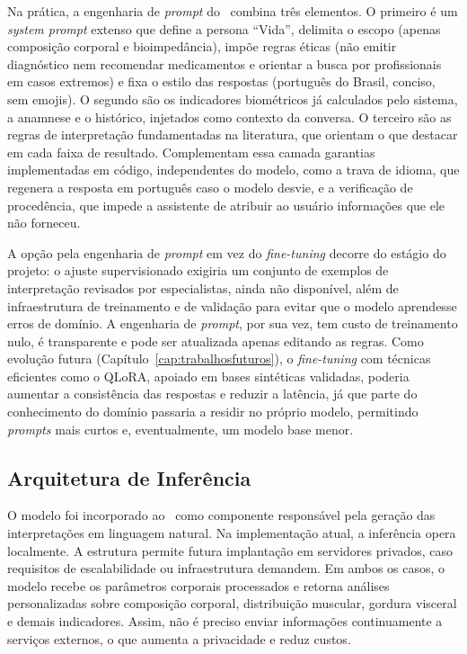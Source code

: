 Na prática, a engenharia de \emph{prompt} do \sintonia\ combina três elementos. O primeiro é
um \emph{system prompt} extenso que define a persona ``Vida'', delimita o escopo (apenas
composição corporal e bioimpedância), impõe regras éticas (não emitir diagnóstico nem
recomendar medicamentos e orientar a busca por profissionais em casos extremos) e fixa o
estilo das respostas (português do Brasil, conciso, sem emojis). O segundo são os indicadores
biométricos já calculados pelo sistema, a anamnese e o histórico, injetados como contexto da
conversa. O terceiro são as regras de interpretação fundamentadas na literatura, que orientam
o que destacar em cada faixa de resultado. Complementam essa camada garantias implementadas
em código, independentes do modelo, como a trava de idioma, que regenera a resposta em
português caso o modelo desvie, e a verificação de procedência, que impede a assistente de
atribuir ao usuário informações que ele não forneceu.

A opção pela engenharia de \emph{prompt} em vez do \emph{fine-tuning} decorre do estágio do
projeto: o ajuste supervisionado exigiria um conjunto de exemplos de interpretação revisados
por especialistas, ainda não disponível, além de infraestrutura de treinamento e de validação
para evitar que o modelo aprendesse erros de domínio. A engenharia de \emph{prompt}, por sua
vez, tem custo de treinamento nulo, é transparente e pode ser atualizada apenas editando as
regras. Como evolução futura (Capítulo~\ref{cap:trabalhosfuturos}), o \emph{fine-tuning} com
técnicas eficientes como o QLoRA, apoiado em bases sintéticas validadas, poderia aumentar a
consistência das respostas e reduzir a latência, já que parte do conhecimento do domínio
passaria a residir no próprio modelo, permitindo \emph{prompts} mais curtos e, eventualmente,
um modelo base menor.

\subsection{Arquitetura de Inferência}

O modelo foi incorporado ao \sintonia\ como componente responsável pela
geração das interpretações em linguagem natural. Na implementação atual, a inferência opera
localmente. A estrutura permite futura implantação em servidores privados, caso requisitos
de escalabilidade ou infraestrutura demandem. Em ambos os casos, o modelo recebe os
parâmetros corporais processados e retorna análises personalizadas sobre composição
corporal, distribuição muscular, gordura visceral e demais indicadores. Assim, não é preciso
enviar informações continuamente a serviços externos, o que aumenta a privacidade e reduz
custos.

